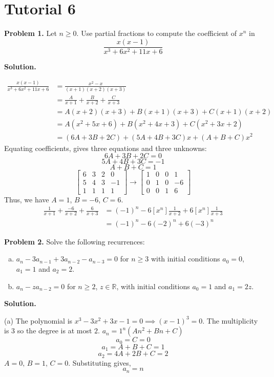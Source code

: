 \section{Tutorial 6}
\textbf{Problem 1.}
Let $ n\geqslant 0 $. Use partial fractions to compute the coefficient of $ x^n $
in
\[ \frac{x(x-1)}{x^3+6x^2+11x+6} \]

\textbf{Solution.}

\begin{align*} \frac{x(x-1)}{x^3+6x^2+11x+6}
    &=\frac{x^2-x}{(x+1)(x+2)(x+3)}\\
    &=\frac{A}{x+1} + \frac{B}{x+2} + \frac{C}{x+3}\\
    &=A(x+2)(x+3)+B(x+1)(x+3)+C(x+1)(x+2)\\
    &=A(x^2+5x+6)+B(x^2+4x+3)+C(x^2+3x+2)\\
    &=(6A+3B+2C) + (5A+4B+3C)x + (A+B+C)x^2
\end{align*}
Equating coefficients, gives three equations and three unknowns:
\[ 6A+3B+2C=0 \]
\[ 5A+4B+3C=-1 \]
\[ A+B+C=1 \]
\[\left[ \begin{array}{ccc|c}
    6 & 3 & 2 & 0\\
    5 & 4 & 3 & -1\\
    1 & 1 & 1 & 1
\end{array}\right]\rightarrow
\left[\begin{array}{ccc|c}
    1 & 0 & 0 & 1\\
    0 & 1 & 0 & -6\\
    0 & 0 & 1 & 6
\end{array}\right] \]
Thus, we have $ A=1 $, $ B=-6 $, $ C=6 $.
\begin{align*}
    \frac{1}{x+1} + \frac{-6}{x+2} + \frac{6}{x+3}
    &= (-1)^n - 6[x^n]\frac{1}{x+2} + 6[x^n]\frac{1}{x+3}\\
    &= (-1)^n - 6 (-2)^n + 6(-3)^n
\end{align*}

\textbf{Problem 2.} Solve the following recurrences:
\begin{enumerate}[(a)]
    \item $ a_n-3a_{n-1}+3a_{n-2}-a_{n-3}=0 $ for $ n\geqslant 3 $
    with initial conditions $ a_0=0 $, $ a_1=1 $ and $ a_2=2 $.
    \item $ a_n-za_{n-2}=0 $ for $ n\geqslant 2 $, $ z\in\mathbb{R} $,
    with initial conditions $ a_0=1 $ and $ a_1=2z $.
\end{enumerate}

\textbf{Solution.}

(a) The polynomial is $ x^3-3x^2+3x-1=0\implies (x-1)^3=0 $. The multiplicity
is $ 3 $ so the degree is at most $ 2 $.
$ a_n=1^n(An^2+Bn+C) $
\[ a_0=C=0 \]
\[ a_1=A+B+C=1 \]
\[ a_2=4A+2B+C=2 \]
$ A=0,\, B=1,\, C=0 $. Substituting gives, 
\[ a_n=n \]

